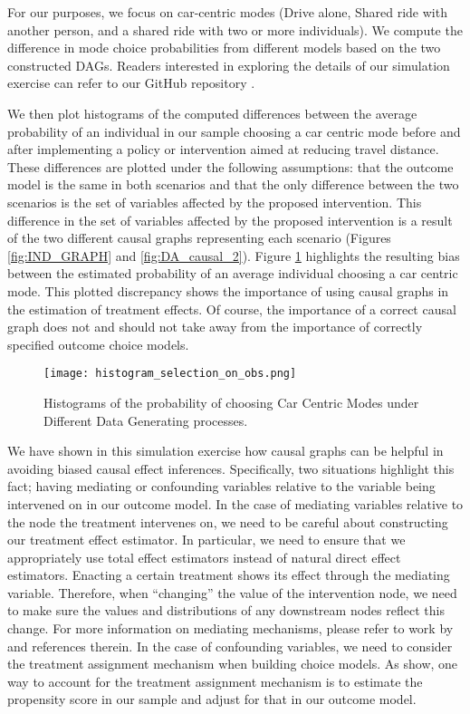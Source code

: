 For our purposes, we focus on car-centric modes (Drive alone, Shared ride with another person,
and a shared ride with two or more individuals).
We compute the difference in mode choice probabilities from different models based on the two constructed DAGs.
Readers interested in exploring the details of our simulation exercise can refer to our GitHub repository \citep{brathwaite_etal_2020}.



We then plot histograms of the computed differences between the average probability of an individual
in our sample choosing a car centric mode before and after implementing a policy or intervention
aimed at reducing travel distance.
These differences are plotted under the following assumptions: that the outcome model is the same in both scenarios and that the only difference between the two scenarios is the set of variables affected by the proposed intervention.
This difference in the set of variables affected by the proposed intervention is a result of the two different causal graphs representing each scenario (Figures \ref{fig:IND_GRAPH} and \ref{fig:DA_causal_2}).
Figure \ref{fig:histogram_probability} highlights the resulting bias between the estimated probability of an average individual choosing a car centric mode.
This plotted discrepancy shows the importance of using causal graphs in the estimation of treatment effects.
Of course, the importance of a correct causal graph does not and should not take away from the importance of correctly specified outcome choice models.

\begin{figure}[h!]
   \centering
   \texttt{[image: histogram\_selection\_on\_obs.png]}
   \caption{Histograms of the probability of choosing Car Centric Modes under Different Data Generating processes.}
   \label{fig:histogram_probability}
\end{figure}

We have shown in this simulation exercise how causal graphs can be helpful in avoiding biased causal effect inferences.
Specifically, two situations highlight this fact; having mediating or confounding variables relative to the variable being intervened on in our outcome model.
In the case of mediating variables relative to the node the treatment intervenes on, we need to be careful about constructing our treatment effect estimator.
In particular, we need to ensure that we appropriately use total effect estimators instead of natural direct effect estimators.
Enacting a certain treatment shows its effect through the mediating variable.
Therefore, when ``changing'' the value of the intervention node, we need to make sure the values and distributions of any downstream nodes reflect this change.
For more information on mediating mechanisms, please refer to work by \citet{pearl_2012_mediation} and references therein.
In the case of confounding variables, we need to consider the treatment assignment mechanism when building choice models.
As \citep{hahn_2020_bayesian} show, one way to account for the treatment assignment mechanism is to estimate the propensity score in our sample and adjust for that in our outcome model.

